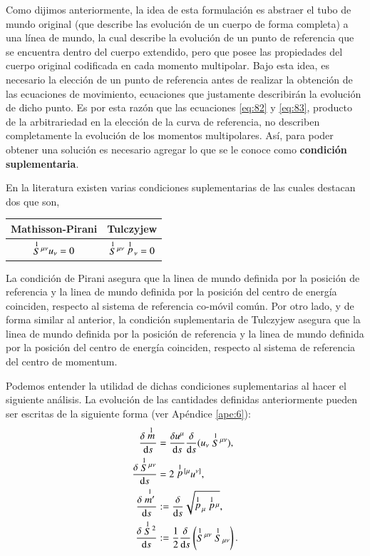 Como dijimos anteriormente, la idea de esta formulación es abstraer el tubo de mundo original (que describe las evolución de un cuerpo de forma completa) a una línea de mundo, la cual describe la evolución de un punto de referencia que se encuentra dentro del cuerpo extendido, pero que posee las propiedades del cuerpo original codificada en cada momento multipolar. Bajo esta idea, es necesario la elección de un punto de referencia antes de realizar la obtención de las ecuaciones de movimiento, ecuaciones que justamente describirán la evolución de dicho punto. Es por esta razón que las ecuaciones \eqref{eq:82} y \eqref{eq:83}, producto de la arbitrariedad en la elección de la curva de referencia, no describen completamente la evolución de los momentos multipolares. Así, para poder obtener una solución es necesario agregar lo que se le conoce como \textbf{condición suplementaria}.

En la literatura existen varias condiciones suplementarias de las cuales destacan dos que son,
\begin{center}
\begin{tabular}{cc}
\hline
Mathisson-Pirani & Tulczyjew \\
\hline \hline
$\stackrel{1}{S}{\!}^{\mu \nu} u_{\nu} = 0 $ & $\stackrel{1}{S}{\!}^{\mu \nu} \stackrel{1}{p}{\!}_{\nu} = 0 $ \\
\hline
\end{tabular}
\end{center}

La condición de Pirani asegura que la linea de mundo definida por la posición de referencia y la linea de mundo definida por la posición del centro de energía coinciden, respecto al sistema de referencia co-móvil común. Por otro lado, y de forma similar al anterior, la condición suplementaria de Tulczyjew asegura que la linea de mundo definida por la posición de referencia y la linea de mundo definida por la posición del centro de energía coinciden, respecto al sistema de referencia del centro de momentum.

Podemos entender la utilidad de dichas condiciones suplementarias al hacer el siguiente análisis. La evolución de las cantidades definidas anteriormente pueden ser escritas de la siguiente forma (ver Apéndice \ref{ape:6}):
\begin{align}
\label{eq:45}
\cd{\des{1}{m}} &= \cd{u^{\mu}} \cd{}(u_{\nu} \des{1}{S}^{\mu \nu}),\\
\label{eq:103}
\cd{\des{1}{S}^{\mu \nu}} &= 2 \des{1}{p}^{[\mu} u^{\nu]},\\
\label{eq:46}
\cd{\des{1}{m'}} &:= \cd{}\sqrt{\des{1}{p}_{\mu}\des{1}{p}^{\mu}},\\
\label{eq:47}
\cd{\des{1}{S}^2} &:= \frac{1}{2} \cd{} \left( \des{1}{S}^{\mu \nu} \des{1}{S}_{\mu \nu} \right).
\end{align}

